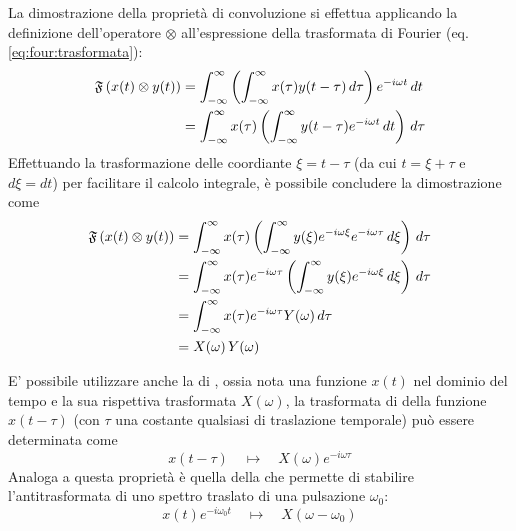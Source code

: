 		\begin{dimostrazione}
			La dimostrazione della proprietà di convoluzione si effettua applicando la definizione dell'operatore $\otimes$ all'espressione della trasformata di Fourier (eq. \ref{eq:four:trasformata}):
			\begin{align*}
				\mathfrak F \left(x(t)\otimes y(t)\right) & = \int_{-\infty}^\infty \left( \int_{-\infty}^\infty x(\tau) y(t-\tau) \, d\tau\right) e^{-i\omega t}\, dt \\
				& = \int_{-\infty}^\infty x(\tau) \left(\int_{-\infty}^\infty y(t-\tau) e ^{-i\omega t} \, dt\right)\, d\tau
			\end{align*}
			Effettuando la trasformazione delle coordiante $\xi = t-\tau$ (da cui $t= \xi + \tau $ e  $d\xi = dt$) per facilitare il calcolo integrale, è possibile concludere la dimostrazione come
			\begin{align*}
				\mathfrak F \left(x(t)\otimes y(t)\right) & = \int_{-\infty}^\infty x(\tau) \left( \int_{-\infty}^\infty y(\xi) e^{-i\omega \xi} e^{-i\omega \tau}\, d\xi \right)\, d\tau \\
				& = \int_{-\infty}^\infty x(\tau) e^{-i\omega \tau} \left( \int_{-\infty}^\infty y(\xi) e^{-i\omega \xi}\, d\xi\right) \, d\tau \\
				& = \int_{-\infty}^\infty x(\tau) e^{-i\omega \tau} Y(\omega) \, d\tau \\
				& = X(\omega)\, Y(\omega)
			\end{align*}
		\end{dimostrazione}
		
		E' possibile utilizzare anche la  di , ossia nota una funzione $x(t)$ nel dominio del tempo e la sua rispettiva trasformata $X(\omega)$, la trasformata di della funzione $x(t-\tau)$ (con $\tau$ una costante qualsiasi di traslazione temporale) può essere determinata come
		\[ x(t-\tau) \quad \mapsto \quad X(\omega) e^{-i\omega \tau} \]
		Analoga a questa proprietà è quella della  che permette di stabilire l'antitrasformata di uno spettro traslato di una pulsazione $\omega_0$:
		\[ x(t) e^{-i\omega_0t} \quad \mapsto \quad X(\omega-\omega_0) \]
		
